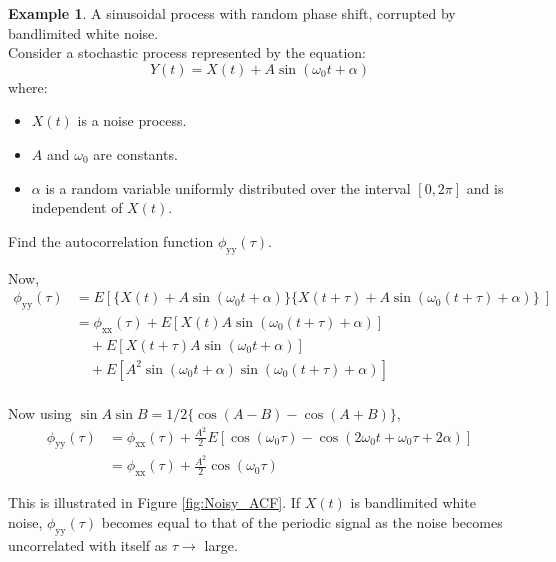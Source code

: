 \documentclass[12pt]{book}
\theoremstyle{definition}
\newtheorem{exmp}{Example}[chapter]
\begin{document}
\begin{tcolorbox}
    
\begin{exmp}{A sinusoidal process with random phase shift, corrupted by bandlimited white noise.}\\

Consider a stochastic process represented by the equation:
\[Y(t) = X(t) + A \sin(\omega_0 t + \alpha) \]
where:
\begin{itemize}
  \item \(X(t)\) is a noise process.
  \item \(A\) and \(\omega_0\) are constants.
  \item \(\alpha\) is a random variable uniformly distributed over the interval \([0, 2\pi]\) and is independent of \(X(t)\).
\end{itemize}

Find the autocorrelation function $\phi_\mathrm{yy}(\tau)$.
\end{exmp}
\end{tcolorbox}

Now,
\[
\begin{split}    
\phi_\mathrm{yy}(\tau) & = E\left [ \{X(t) + A \sin (\omega_0 t + \alpha)\}\{X(t+\tau) + A \sin (\omega_0 (t + \tau)+ \alpha)\}\ \right ] \\
    & = \phi_\mathrm{xx}(\tau) +  E\left [X(t)A \sin (\omega_0 (t+\tau) + \alpha) \right ] \\
    & \quad  + E\left [X(t+\tau)A \sin (\omega_0 t + \alpha) \right ] \\
    & \quad  + E\left [A^2 \sin (\omega_0 t + \alpha) \sin (\omega_0 (t+\tau) + \alpha)\right ]  \quad  \\
\end{split}
\]

Now using \( \sin A \sin B = 1/2 \{\cos (A-B) - \cos (A+B)\}\),\\

\[
\begin{split}    
\phi_\mathrm{yy}(\tau) & = \phi_\mathrm{xx}(\tau) + \frac{A^2}{2}E\left [ \cos(\omega_0 \tau) - \cos(2 \omega_0 t + \omega_0 \tau + 2 \alpha)\right ] \\
    & = \phi_\mathrm{xx}(\tau) + \frac{A^2}{2} \cos(\omega_0 \tau)
\end{split}
\]

This is illustrated in Figure \ref{fig:Noisy_ACF}. If \(X(t)\) is bandlimited white noise, \(\phi_\mathrm{yy}(\tau)\) becomes equal to that of the periodic signal as the noise becomes uncorrelated with itself as \(\tau \rightarrow \) large. 
\end{document}
